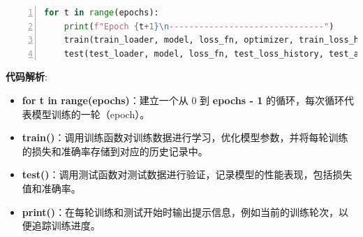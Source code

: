 \begin{lstlisting}[language={python},label={执行训练循环},caption={执行训练循环}, basicstyle=\footnotesize\ttfamily, breaklines=true, numbers=left, frame=single]
for t in range(epochs):
    print(f"Epoch {t+1}\n-------------------------------")
    train(train_loader, model, loss_fn, optimizer, train_loss_history, train_acc_history)
    test(test_loader, model, loss_fn, test_loss_history, test_acc_history)
\end{lstlisting}
\textbf{代码解析}:
\begin{itemize}
    \item \textbf{for t in range(epochs)}：建立一个从 0 到 \textbf{epochs - 1} 的循环，每次循环代表模型训练的一轮（epoch）。
    \item \textbf{train()}：调用训练函数对训练数据进行学习，优化模型参数，并将每轮训练的损失和准确率存储到对应的历史记录中。
    \item \textbf{test()}：调用测试函数对测试数据进行验证，记录模型的性能表现，包括损失值和准确率。
    \item \textbf{print()}：在每轮训练和测试开始时输出提示信息，例如当前的训练轮次，以便追踪训练进度。
\end{itemize}

